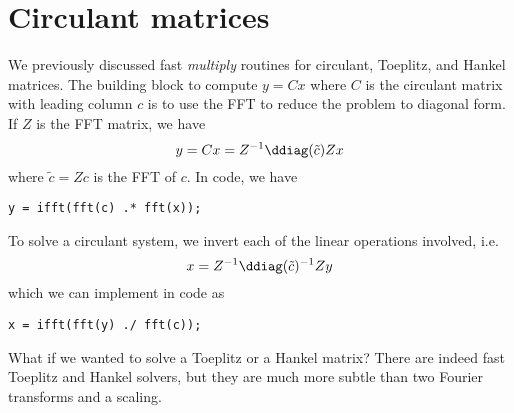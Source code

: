 \section{Circulant matrices}

We previously discussed fast {\em multiply} routines for circulant,
Toeplitz, and Hankel matrices.  The building block
to compute $y = Cx$ where $C$ is the circulant matrix with leading
column $c$ is to use the FFT to reduce the problem to diagonal form.
If $Z$ is the FFT matrix, we have
\[
  y = Cx = Z^{-1} \ddiag(\tilde{c}) Z x
\]
where $\tilde{c} = Zc$ is the FFT of $c$.  In code, we have
\begin{lstlisting}
y = ifft(fft(c) .* fft(x));
\end{lstlisting}
To solve a circulant system, we invert each of the linear operations
involved, i.e.
\[
  x = Z^{-1} \ddiag(\tilde{c})^{-1} Zy
\]
which we can implement in code as
\begin{lstlisting}
x = ifft(fft(y) ./ fft(c));
\end{lstlisting}
What if we wanted to solve a Toeplitz or a Hankel matrix?  There are
indeed fast Toeplitz and Hankel solvers, but they are much more subtle
than two Fourier transforms and a scaling.
